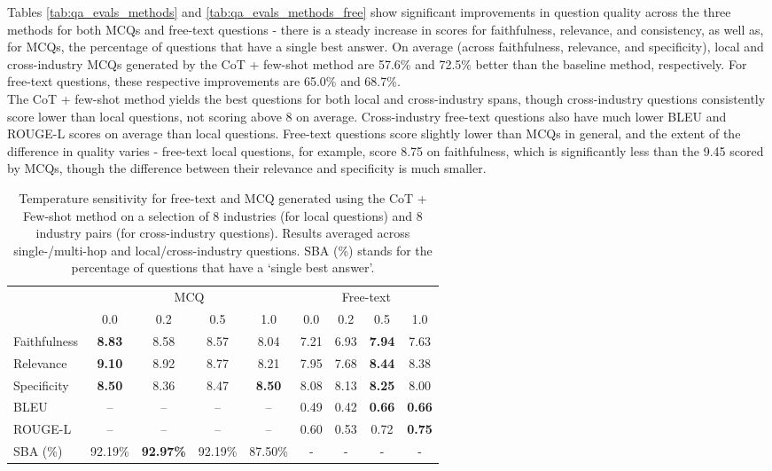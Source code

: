 Tables \ref{tab:qa_evals_methods} and \ref{tab:qa_evals_methods_free} show significant improvements in question quality across the three methods for both MCQs and free-text questions - there is a steady increase in scores for faithfulness, relevance, and consistency, as well as, for MCQs, the percentage of questions that have a single best answer. On average (across faithfulness, relevance, and specificity), local and cross-industry MCQs generated by the CoT + few-shot method are 57.6\% and 72.5\% better than the baseline method, respectively. For free-text questions, these respective improvements are 65.0\% and 68.7\%. \\

The CoT + few-shot method yields the best questions for both local and cross-industry spans, though cross-industry questions consistently score lower than local questions, not scoring above 8 on average. Cross-industry free-text questions also have much lower BLEU and ROUGE-L scores on average than local questions. Free-text questions score slightly lower than MCQs in general, and the extent of the difference in quality varies - free-text local questions, for example, score 8.75 on faithfulness, which is significantly less than the 9.45 scored by MCQs, though the difference between their relevance and specificity is much smaller.


\begin{table}[H]
\centering
\small
\begin{tabular}{lcccccccc}
\hline
\multirow{2}{*}{} & \multicolumn{4}{c}{MCQ}              & \multicolumn{4}{c}{Free-text} \\ \cline{2-9} 
                  & 0.0     & 0.2     & 0.5     & 1.0     & 0.0    & 0.2   & 0.5   & 1.0   \\ \cline{2-9} 
Faithfulness      & \textbf{8.83}    & 8.58    & 8.57    & 8.04    & 7.21   & 6.93  & \textbf{7.94}  & 7.63  \\
Relevance         & \textbf{9.10}    & 8.92    & 8.77    & 8.21    & 7.95   & 7.68  & \textbf{8.44}  & 8.38  \\
Specificity       & \textbf{8.50}    & 8.36    & 8.47    & \textbf{8.50}    & 8.08   & 8.13  & \textbf{8.25}  & 8.00  \\
BLEU              & --      & --      & --      & --      & 0.49   & 0.42  & \textbf{0.66}  & \textbf{0.66} \\
ROUGE-L           & --      & --      & --      & --      & 0.60   & 0.53  & 0.72  & \textbf{0.75}  \\
SBA (\%)          & 92.19\% & \textbf{92.97\%} & 92.19\% & 87.50\% & -      & -     & -     & -     \\ \hline
\end{tabular}
\caption{Temperature sensitivity for free-text and MCQ generated using the CoT + Few-shot method on a selection of 8 industries (for local questions) and 8 industry pairs (for cross-industry questions). Results averaged across single-/multi-hop and local/cross-industry questions. SBA (\%) stands for the percentage of questions that have a `single best answer'.}
\label{tab:temperature-comparison}
\end{table}

